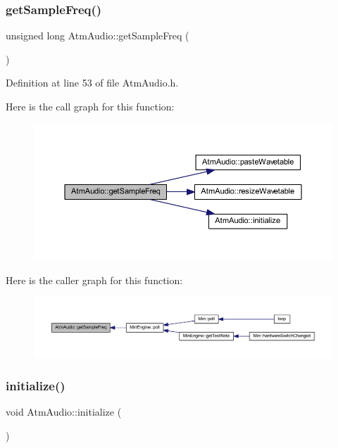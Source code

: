 \subsubsection{\texorpdfstring{get\+Sample\+Freq()}{getSampleFreq()}}
{\footnotesize\ttfamily unsigned long Atm\+Audio\+::get\+Sample\+Freq (\begin{DoxyParamCaption}{ }\end{DoxyParamCaption})\hspace{0.3cm}{\ttfamily [inline]}}



Definition at line 53 of file Atm\+Audio.\+h.

Here is the call graph for this function\+:
\nopagebreak
\begin{figure}[H]
\begin{center}
\leavevmode
\includegraphics[width=350pt]{d2/de6/class_atm_audio_a9336911a6a8dd22d4030b0457270c242_cgraph}
\end{center}
\end{figure}
Here is the caller graph for this function\+:
\nopagebreak
\begin{figure}[H]
\begin{center}
\leavevmode
\includegraphics[width=350pt]{d2/de6/class_atm_audio_a9336911a6a8dd22d4030b0457270c242_icgraph}
\end{center}
\end{figure}
\mbox{\label{class_atm_audio_ada27d4d2556b8b27f4c3c8b4da763176}} 
\subsubsection{\texorpdfstring{initialize()}{initialize()}}
{\footnotesize\ttfamily void Atm\+Audio\+::initialize (\begin{DoxyParamCaption}{ }\end{DoxyParamCaption})\hspace{0.3cm}{\ttfamily [static]}}



